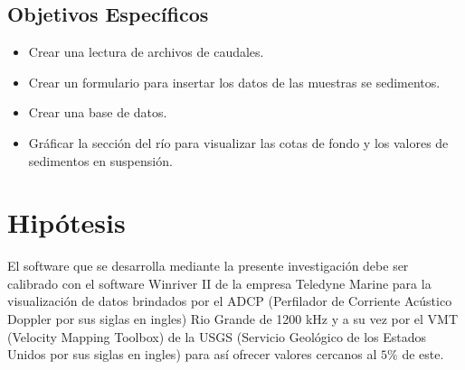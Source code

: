 \documentclass[12pt,a4paper]{report}
\begin{document}
	\subsection{Objetivos Específicos}
	\begin{itemize}
	\item Crear una lectura de archivos de caudales.
	\item Crear un formulario para insertar los datos de las muestras se sedimentos.
	\item Crear una base de datos.
	\item Gráficar la sección del río para visualizar las cotas de fondo y los valores de sedimentos en suspensión.
	\end{itemize}

\section{Hipótesis}
	El software que se desarrolla mediante la presente investigación debe ser calibrado con el software Winriver II de la empresa Teledyne Marine para la visualización de datos brindados por el ADCP (Perfilador de Corriente Acústico Doppler por sus siglas en ingles) Rio Grande de 1200 kHz y a su vez por el VMT (Velocity Mapping Toolbox) de la USGS (Servicio Geológico de los Estados Unidos por sus siglas en ingles) para así ofrecer valores cercanos al $5\%$ de este.
\end{document}
